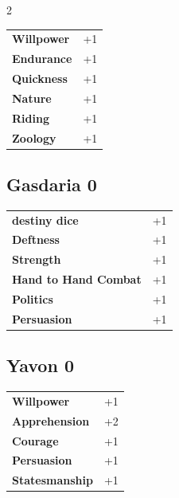 \begin{multicols}{2}
\begin{tcolorbox}
\begin{tabular}{@{}ll@{}}
    \textbf{Willpower} & +1\\
    \textbf{Endurance} & +1\\
    \textbf{Quickness} & +1\\
    \textbf{Nature} & +1\\
    \textbf{Riding} & +1\\
    \textbf{Zoology} & +1\\
\end{tabular}


\end{tcolorbox}

\begin{tcolorbox}
    \subsection*{Gasdaria \hfill \small{0 }}
    \tcblower




\begin{tabular}{@{}ll@{}}
    \textbf{destiny dice} & +1\\
    \textbf{Deftness} & +1\\
    \textbf{Strength} & +1\\
    \textbf{Hand to Hand Combat} & +1\\
    \textbf{Politics} & +1\\
    \textbf{Persuasion} & +1\\
\end{tabular}


\end{tcolorbox}

\begin{tcolorbox}
    \subsection*{Yavon \hfill \small{0 }}
    \tcblower




\begin{tabular}{@{}ll@{}}
    \textbf{Willpower} & +1\\
    \textbf{Apprehension} & +2\\
    \textbf{Courage} & +1\\
    \textbf{Persuasion} & +1\\
    \textbf{Statesmanship} & +1\\
\end{tabular}


\end{tcolorbox}
\end{multicols}
